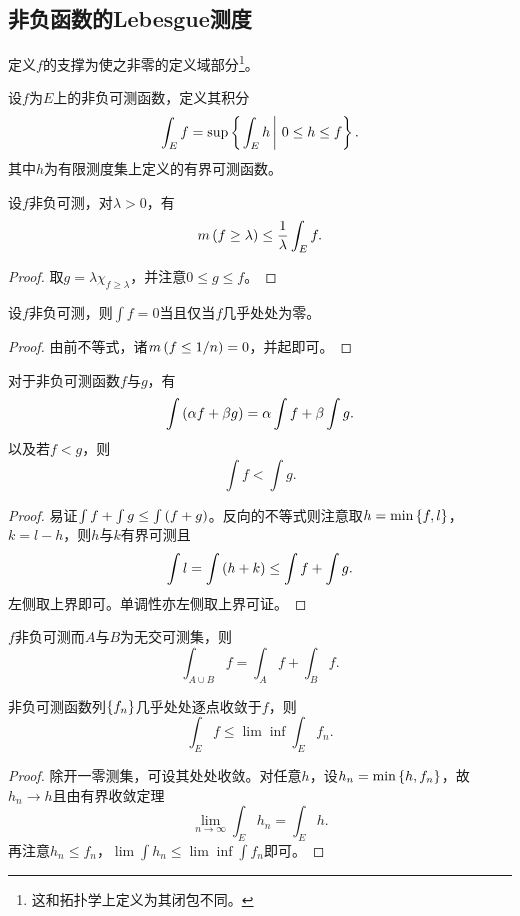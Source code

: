 \documentclass{ctexrep}
\begin{document}
  \subsection{非负函数的Lebesgue测度}
  \begin{definition}
    定义$f$的支撑为使之非零的定义域部分\footnote{这和拓扑学上定义为其闭包不同。}。
  \end{definition}
  \begin{definition}
    设$f$为$E$上的非负可测函数，定义其积分
    \[ \int_E f = \sup \left\{\left. \int_E h \, \right| \, 0\le h \le f\right\}. \]
    其中$h$为有限测度集上定义的有界可测函数。
  \end{definition}
  \begin{proposition}[Chebychev不等式]
    设$f$非负可测，对$\lambda>0$，有
    \[ m\left(f\ge \lambda\right) \le \frac{1}{\lambda}\int_E f. \]
  \end{proposition}
  \begin{proof}
    取$g=\lambda\chi_{f\ge\lambda}$，并注意$0\le g\le f$。
  \end{proof}
  \begin{proposition}
    \label{prp:ae0}
    设$f$非负可测，则$\int f = 0$当且仅当$f$几乎处处为零。
  \end{proposition}
  \begin{proof}
    由前不等式，诸$m\left(f\le1/n\right)=0$，并起即可。
  \end{proof}
  \begin{proposition}[积分的线性与单调性]
    对于非负可测函数$f$与$g$，有
    \[ \int\left(\alpha f+\beta g\right) = \alpha\int f + \beta\int g. \]
    以及若$f<g$，则
    \[ \int f < \int g. \]
  \end{proposition}
  \begin{proof}
    易证$\int f + \int g \le \int \left(f+g\right)$。反向的不等式则注意取$h=\text{min}\left\{f,l\right\}$，$k=l-h$，则$h$与$k$有界可测且
    \[ \int l = \int\left(h+k\right) \le \int f + \int g. \]
    左侧取上界即可。单调性亦左侧取上界可证。
  \end{proof}
  \begin{theorem}[积分区间的可加性]
    $f$非负可测而$A$与$B$为无交可测集，则
    \[ \int_{A\cup B} f = \int_A f + \int_B f. \]
  \end{theorem}
  \begin{lemma}[Fatou引理]
    非负可测函数列$\left\{f_n\right\}$几乎处处逐点收敛于$f$，则
    \[ \int_E f \le \lim\inf\int_E f_n. \]
  \end{lemma}
  \begin{proof}
    除开一零测集，可设其处处收敛。对任意$h$，设$h_n=\text{min}\left\{h,f_n\right\}$，故$h_n\to h$且由有界收敛定理
    \[ \lim_{n\to\infty} \int_E h_n = \int_E h. \]
    再注意$h_n\le f_n$，$\lim\int h_n \le \lim \inf \int f_n$即可。
  \end{proof}
\end{document}
